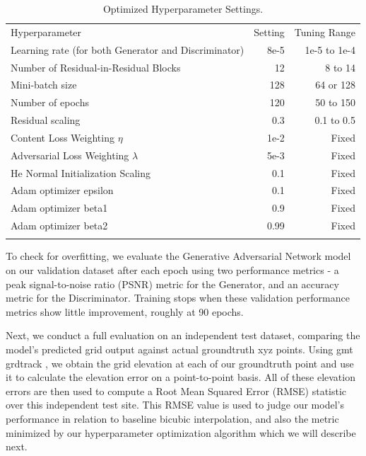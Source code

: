 \documentclass[tc, manuscript]{copernicus}
\begin{document}
\begin{table}[h]
\caption{Optimized Hyperparameter Settings.}
\label{table:1}
\begin{tabular}{lrr}
\tophline
Hyperparameter & Setting & Tuning Range \\
\middlehline
Learning rate (for both Generator and Discriminator) & 8e-5 & 1e-5 to 1e-4 \\
Number of Residual-in-Residual Blocks & 12 & 8 to 14 \\
Mini-batch size & 128 & 64 or 128 \\
Number of epochs & 120 & 50 to 150 \\
Residual scaling & 0.3 & 0.1 to 0.5 \\
Content Loss Weighting $\eta$ & 1e-2 & Fixed \\
Adversarial Loss Weighting $\lambda$ & 5e-3 & Fixed \\
He Normal Initialization Scaling & 0.1 & Fixed \\
Adam optimizer epsilon & 0.1 & Fixed \\
Adam optimizer beta1 & 0.9 & Fixed \\
Adam optimizer beta2 & 0.99 & Fixed \\
\bottomhline
\end{tabular}
\belowtable{} %
\end{table}

To check for overfitting, we evaluate the Generative Adversarial Network model on our validation dataset after each epoch using two performance metrics - a peak signal-to-noise ratio (PSNR) metric for the Generator, and an accuracy metric for the Discriminator.
Training stops when these validation performance metrics show little improvement, roughly at 90 epochs.

Next, we conduct a full evaluation on an independent test dataset, comparing the model's predicted grid output against actual groundtruth xyz points.
Using gmt grdtrack \citep{WesselGenericMappingTools2013}, we obtain the grid elevation at each of our groundtruth point and use it to calculate the elevation error on a point-to-point basis.
All of these elevation errors are then used to compute a Root Mean Squared Error (RMSE) statistic over this independent test site.
This RMSE value is used to judge our model's performance in relation to baseline bicubic interpolation, and also the metric minimized by our hyperparameter optimization algorithm which we will describe next.
\end{document}
